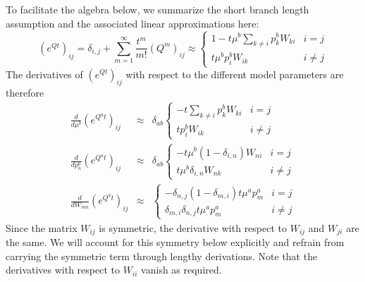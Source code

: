 \documentclass[aps,rmp,onecolumn]{revtex4}
\newcommand{\eqp}{p}
\begin{document}
To facilitate the algebra below, we summarize the short branch length assumption and the associated linear approximations here:
\begin{equation}
	\left( e^{Q t}\right)_{ij} = \delta_{i,j} + \sum_{m=1}^\infty \frac{t^m}{m!}\left( Q^m\right)_{ij} \approx
	\begin{cases}
	1 - t\mu^b \sum_{k\neq i} \eqp_k^b W_{ki} & i=j \\
	t\mu^b \eqp^b_i W_{ik} & i\neq j
	\end{cases}
\end{equation}
The derivatives of $\left( e^{Q t}\right)_{ij}$ with respect to the different model parameters are therefore
\begin{eqnarray}
	\frac{d}{d\mu^b} \left( e^{Q^a t}\right)_{ij} &\approx & \delta_{ab}
	\begin{cases}
	-t\sum_{k\neq i} \eqp_k^b W_{ki} & i=j \\
	t \eqp^b_i W_{ik} & i\neq j
	\end{cases} \\
	\frac{d}{d\eqp_n^b} \left( e^{Q^a t}\right)_{ij} &\approx & \delta_{ab}
	\begin{cases}
	-t\mu^b (1-\delta_{i,n})W_{ni} & i=j \\
	 t\mu^b \delta_{i,n}W_{nk} & i\neq j
	\end{cases}\\
	\frac{d}{dW_{mn}} \left( e^{Q^a t}\right)_{ij} &\approx &
	\begin{cases}
	-\delta_{n,j}(1-\delta_{m,i})t \mu^a \eqp^a_m  & i=j \\
	 \delta_{m,i}\delta_{n,j} t\mu^a \eqp^a_m & i\neq j
	\end{cases}
\end{eqnarray}
Since the matrix $W_{ij}$ is symmetric, the derivative with respect to $W_{ij}$ and $W_{ji}$ are the same.
We will account for this symmetry below explicitly and refrain from carrying the symmetric term through lengthy derivations.
Note that the derivatives with respect to $W_{ii}$ vanish as required.
\end{document}
